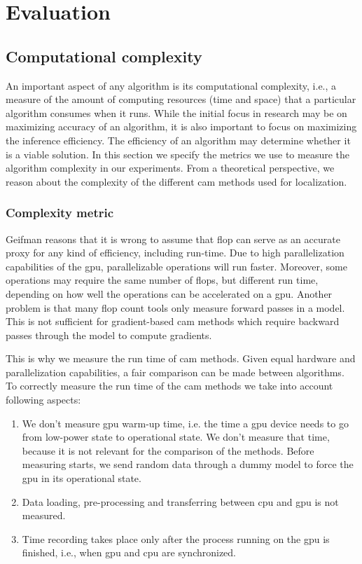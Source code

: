 \section{Evaluation}
\subsection{Computational complexity} \label{sec:computational_complexity}
An important aspect of any algorithm is its computational complexity, i.e., a measure of the amount of computing resources (time and space) that a particular algorithm consumes when it runs. While the initial focus in research may be on maximizing accuracy of an algorithm, it is also important to focus on maximizing the inference efficiency. The efficiency of an algorithm may determine whether it is a viable solution. In this section we specify the metrics we use to measure the algorithm complexity in our experiments. From a theoretical perspective, we reason about the complexity of the different \acrshort{cam} methods used for localization.

\subsubsection{Complexity metric}
Geifman \cite{article:FLOPSvsRuntime} reasons that it is wrong to assume that \acrfull{flop} can serve as an accurate proxy for any kind of efficiency, including run-time. Due to high parallelization capabilities of the \acrshort{gpu}, parallelizable operations will run faster. Moreover, some operations may require the same number of \acrshort{flop}s, but different run time, depending on how well the operations can be accelerated on a \acrshort{gpu}. Another problem is that many \acrshort{flop} count tools only measure forward passes in a model. This is not sufficient for gradient-based \acrshort{cam} methods which require backward passes through the model to compute gradients.

This is why we measure the run time of \acrshort{cam} methods. Given equal hardware and parallelization capabilities, a fair comparison can be made between algorithms. To correctly measure the run time of the \acrshort{cam} methods we take into account following aspects:
\begin{enumerate}
    \item We don't measure \acrshort{gpu} warm-up time, i.e. the time a \acrshort{gpu} device needs to go from low-power state to operational state. We don't measure that time, because it is not relevant for the comparison of the methods. Before measuring starts, we send random data through a dummy model to force the \acrshort{gpu} in its operational state.
    \item Data loading, pre-processing and transferring between \acrshort{cpu} and \acrshort{gpu} is not measured.
    \item  Time recording takes place only after the process running on the \acrshort{gpu} is finished, i.e., when \acrshort{gpu} and \acrshort{cpu} are synchronized.
\end{enumerate}
